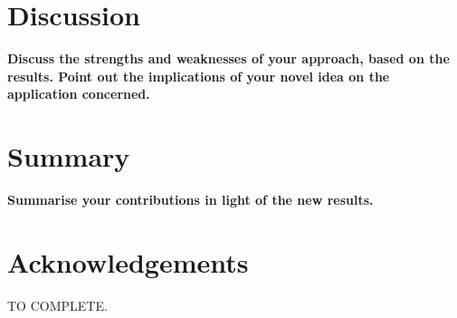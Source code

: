 \documentclass[11pt,conference,compsocconf]{IEEEtran}
\begin{document}
\section{Discussion}\label{sec:discussion}
  \textbf{Discuss the strengths and weaknesses of your
  approach, based on the results. Point out the implications of your
  novel idea on the application concerned.}
  
\section{Summary}\label{sec:summary}
  \textbf{Summarise your contributions in light of the new
  results.}

\section*{Acknowledgements}
TO COMPLETE.

\newpage


\end{document}
